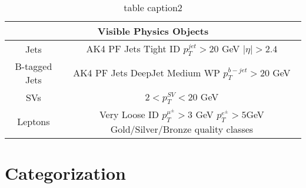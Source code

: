 \begin{table}
\centering
\label{tab:physicsobjects}
\caption{table caption2}
\begin{tabular}{c|c}
\hline 
\multicolumn{2}{c}{Visible Physics Objects} \\ 
\hline 
\hline
Jets & \makecell{AK4 PF Jets \\ Tight ID \\ $p_T^{jet} > 20$ GeV \\ $|\eta|>2.4$} \\ 
\hline
B-tagged Jets & \makecell{AK4 PF Jets \\ DeepJet Medium WP \\ $p_T^{b-jet} > 20 $ GeV}  \\ 
\hline
SVs & $2<p_T^{SV}<20$ GeV \\ 
\hline
Leptons & \makecell{Very Loose ID \\ $p_T^{\mu^\pm} > 3$ GeV \\ $p_T^{e^\pm} > 5 $GeV \\ Gold/Silver/Bronze quality classes} \\ 
\hline 
\end{tabular} 
\end{table}

\section{Categorization}

